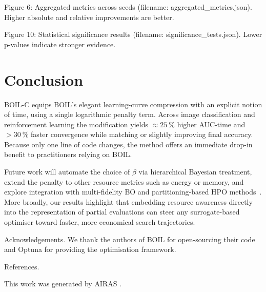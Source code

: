 \documentclass{article} %
\begin{document}
Figure 6: Aggregated metrics across seeds (filename: aggregated\_metrics.json). Higher absolute and relative improvements are better.

Figure 10: Statistical significance results (filename: significance\_tests.json). Lower p-values indicate stronger evidence.

\section{Conclusion}
\label{sec:conclusion}
BOIL-C equips BOIL's elegant learning-curve compression with an explicit notion of time, using a single logarithmic penalty term. Across image classification and reinforcement learning the modification yields \(\approx 25\ \%\) higher AUC-time and \(>30\ \%\) faster convergence while matching or slightly improving final accuracy. Because only one line of code changes, the method offers an immediate drop-in benefit to practitioners relying on BOIL.

Future work will automate the choice of \(\beta\) via hierarchical Bayesian treatment, extend the penalty to other resource metrics such as energy or memory, and explore integration with multi-fidelity BO and partitioning-based HPO methods~\cite{mlodozeniec-2023-hyperparameter}. More broadly, our results highlight that embedding resource awareness directly into the representation of partial evaluations can steer any surrogate-based optimiser toward faster, more economical search trajectories.

Acknowledgements. We thank the authors of BOIL for open-sourcing their code and Optuna for providing the optimisation framework.

References.~\cite{nguyen-2019-bayesian,mlodozeniec-2023-hyperparameter}

This work was generated by \textsc{AIRAS} \citep{airas2025}.



\end{document}
